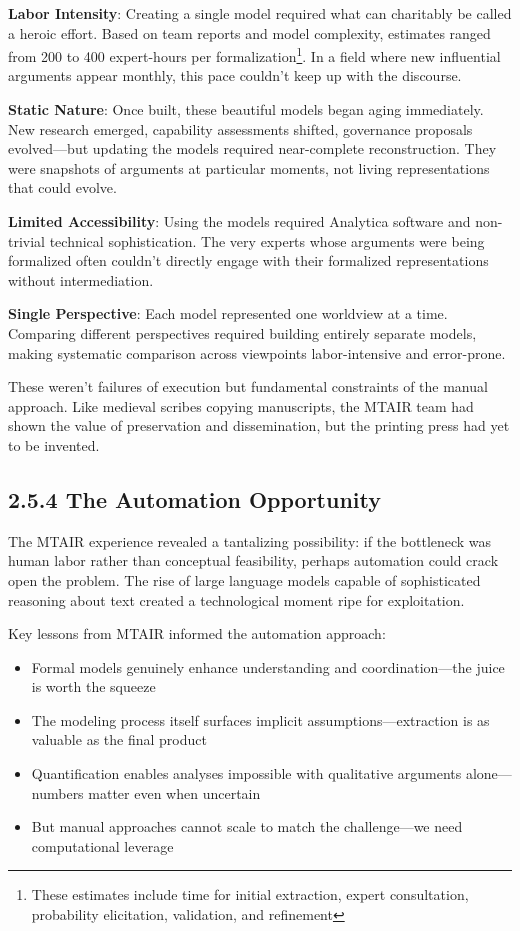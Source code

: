 \documentclass[
  11pt,
  letterpaper,
  openany]{book}
\providecommand{\tightlist}{%
  \setlength{\itemsep}{0pt}\setlength{\parskip}{0pt}}
\begin{document}
\textbf{Labor Intensity}: Creating a single model required what can
charitably be called a heroic effort. Based on team reports and model
complexity, estimates ranged from 200 to 400 expert-hours per
formalization\footnote{These estimates include time for initial
  extraction, expert consultation, probability elicitation, validation,
  and refinement}. In a field where new influential arguments appear
monthly, this pace couldn't keep up with the discourse.

\textbf{Static Nature}: Once built, these beautiful models began aging
immediately. New research emerged, capability assessments shifted,
governance proposals evolved---but updating the models required
near-complete reconstruction. They were snapshots of arguments at
particular moments, not living representations that could evolve.

\textbf{Limited Accessibility}: Using the models required Analytica
software and non-trivial technical sophistication. The very experts
whose arguments were being formalized often couldn't directly engage
with their formalized representations without intermediation.

\textbf{Single Perspective}: Each model represented one worldview at a
time. Comparing different perspectives required building entirely
separate models, making systematic comparison across viewpoints
labor-intensive and error-prone.

These weren't failures of execution but fundamental constraints of the
manual approach. Like medieval scribes copying manuscripts, the MTAIR
team had shown the value of preservation and dissemination, but the
printing press had yet to be invented.

\subsection{2.5.4 The Automation
Opportunity}\label{sec-automation-opportunity}

The MTAIR experience revealed a tantalizing possibility: if the
bottleneck was human labor rather than conceptual feasibility, perhaps
automation could crack open the problem. The rise of large language
models capable of sophisticated reasoning about text created a
technological moment ripe for exploitation.

Key lessons from MTAIR informed the automation approach:

\begin{itemize}
\tightlist
\item
  Formal models genuinely enhance understanding and coordination---the
  juice is worth the squeeze
\item
  The modeling process itself surfaces implicit assumptions---extraction
  is as valuable as the final product
\item
  Quantification enables analyses impossible with qualitative arguments
  alone---numbers matter even when uncertain
\item
  But manual approaches cannot scale to match the challenge---we need
  computational leverage
\end{itemize}
\end{document}
